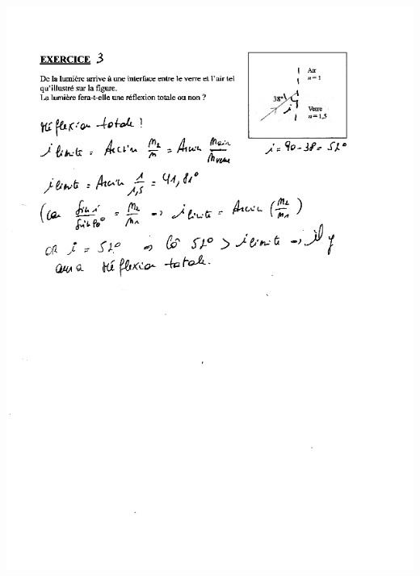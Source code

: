 \includegraphics[width=17.503cm,height=24.231cm]{Pictures/100000010000026F0000035E9FDA6B0D4D8F454A.png}

